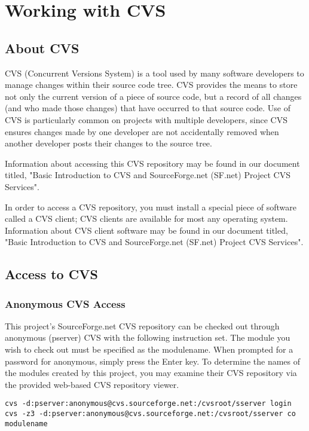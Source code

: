 
\chapter{Working with CVS}

\section{About CVS}

CVS (Concurrent Versions System) is a tool used by many software developers to manage 
changes within their source code tree. CVS provides the means to store not only the current 
version of a piece of source code, but a record of all changes (and who made those changes) 
that have occurred to that source code. Use of CVS is particularly common on projects with 
multiple developers, since CVS ensures changes made by one developer are not accidentally 
removed when another developer posts their changes to the source tree.

Information about accessing this CVS repository may be found in our document titled, 
"Basic Introduction to CVS and SourceForge.net (SF.net) Project CVS Services".

In order to access a CVS repository, you must install a special piece of software called a 
CVS client; CVS clients are available for most any operating system. 
Information about CVS client software may be found in our document titled, 
"Basic Introduction to CVS and SourceForge.net (SF.net) Project CVS Services".

\section{Access to CVS}

\subsection{Anonymous CVS Access}
This project's SourceForge.net CVS repository can be checked out through anonymous (pserver) 
CVS with the following instruction set. The module you wish to check out must be specified as 
the modulename. When prompted for a password for anonymous, simply press the Enter key. 
To determine the names of the modules created by this project, you may examine their CVS 
repository via the provided web-based CVS repository viewer.

\begin{verbatim}
cvs -d:pserver:anonymous@cvs.sourceforge.net:/cvsroot/sserver login
cvs -z3 -d:pserver:anonymous@cvs.sourceforge.net:/cvsroot/sserver co modulename
\end{verbatim}

